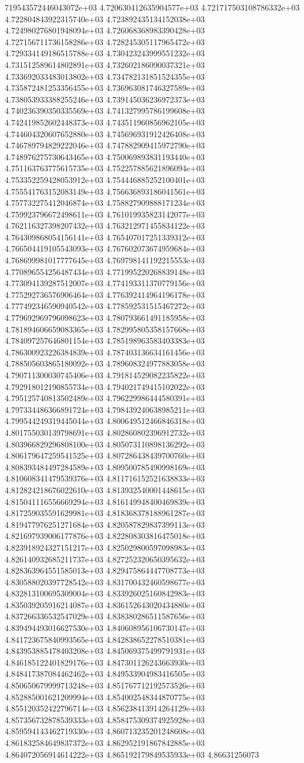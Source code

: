 719543572446043072e+03	4.720630412635904577e+03	4.721717503108786332e+03	4.722804843922315740e+03	4.723892435134152038e+03	4.724980276801948094e+03	4.726068368983390428e+03	4.727156711736158286e+03	4.728245305117965472e+03	4.729334149186515788e+03	4.730423243999551232e+03	4.731512589614802891e+03	4.732602186090037321e+03	4.733692033483013802e+03	4.734782131851524355e+03	4.735872481253356455e+03	4.736963081746327589e+03	4.738053933388255246e+03	4.739145036236972373e+03	4.740236390350335569e+03	4.741327995786199608e+03	4.742419852602448373e+03	4.743511960856962105e+03	4.744604320607652880e+03	4.745696931912426408e+03	4.746789794829222046e+03	4.747882909415972790e+03	4.748976275730643465e+03	4.750069893831193440e+03	4.751163763775615735e+03	4.752257885621896094e+03	4.753352259428053912e+03	4.754446885252100401e+03	4.755541763152083149e+03	4.756636893186041561e+03	4.757732275412046874e+03	4.758827909888171234e+03	4.759923796672498611e+03	4.761019935823142077e+03	4.762116327398207432e+03	4.763212971455834122e+03	4.764309868054156141e+03	4.765407017251339312e+03	4.766504419105543093e+03	4.767602073674959684e+03	4.768699981017777645e+03	4.769798141192215553e+03	4.770896554256487434e+03	4.771995220268839148e+03	4.773094139287512007e+03	4.774193311370779156e+03	4.775292736576906464e+03	4.776392414964196178e+03	4.777492346590940542e+03	4.778592531515467272e+03	4.779692969796098623e+03	4.780793661491185958e+03	4.781894606659083365e+03	4.782995805358157668e+03	4.784097257646801154e+03	4.785198963583403383e+03	4.786300923226384839e+03	4.787403136634161456e+03	4.788505603865180092e+03	4.789608324977883058e+03	4.790711300030745406e+03	4.791814529082235822e+03	4.792918012190855734e+03	4.794021749415102022e+03	4.795125740813502489e+03	4.796229986444580391e+03	4.797334486366891724e+03	4.798439240638985211e+03	4.799544249319445044e+03	4.800649512466846318e+03	4.801755030139798691e+03	4.802860802396912732e+03	4.803966829296808100e+03	4.805073110898136292e+03	4.806179647259541525e+03	4.807286438439700760e+03	4.808393484497284589e+03	4.809500785490998169e+03	4.810608341479539376e+03	4.811716152521638833e+03	4.812824218676022610e+03	4.813932540001448615e+03	4.815041116556669294e+03	4.816149948400469839e+03	4.817259035591629981e+03	4.818368378188961287e+03	4.819477976251271684e+03	4.820587829837399113e+03	4.821697939006177876e+03	4.822808303816475018e+03	4.823918924327151217e+03	4.825029800597098983e+03	4.826140932685211737e+03	4.827252320650395632e+03	4.828363964551585013e+03	4.829475864447708773e+03	4.830588020397728542e+03	4.831700432460598677e+03	4.832813100695309004e+03	4.833926025160842983e+03	4.835039205916214087e+03	4.836152643020434880e+03	4.837266336532547029e+03	4.838380286511587656e+03	4.839494493016627530e+03	4.840608956106730147e+03	4.841723675840993565e+03	4.842838652278510381e+03	4.843953885478403208e+03	4.845069375499791931e+03	4.846185122401829176e+03	4.847301126243663930e+03	4.848417387084462462e+03	4.849533904983416505e+03	4.850650679999713248e+03	4.851767712192573526e+03	4.852885001621209994e+03	4.854002548344870775e+03	4.855120352422796714e+03	4.856238413914264129e+03	4.857356732878539333e+03	4.858475309374925928e+03	4.859594143462719330e+03	4.860713235201248608e+03	4.861832584649837372e+03	4.862952191867842885e+03	4.864072056914614222e+03	4.865192179849535933e+03	4.86631256073